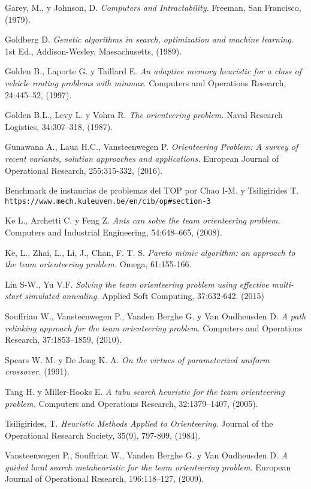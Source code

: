 \begin{thebibliography}{9}
Garey, M., y Johnson, D.
\textit{Computers and Intractability.}
Freeman, San Francisco, (1979).

Goldberg D.
\textit{Genetic algorithms in search, optimization and machine learning.}
1st Ed., Addison-Wesley, Massachusetts, (1989).

Golden B., Laporte G. y Taillard E.
\textit{An adaptive memory heuristic for a class of vehicle routing problems with minmax.}
Computers and Operations Research, 24:445–52, (1997).

Golden B.L., Levy L. y Vohra R. 
\textit{The orienteering problem.}
Naval Research Logistics, 34:307–318, (1987).

Gunawana A., Laua H.C., Vansteenwegen P.
\textit{Orienteering Problem: A survey of recent variants, solution approaches and applications.}
European Journal of Operational Research, 255:315-332, (2016).

Benchmark de instancias de problemas del TOP por Chao I-M. y Tsiligirides T.
\\\texttt{https://www.mech.kuleuven.be/en/cib/op\#section-3}

Ke L., Archetti C. y Feng Z.
\textit{Ants can solve the team orienteering problem.}
Computers and Industrial Engineering, 54:648–665, (2008).

Ke, L., Zhai, L., Li, J., Chan, F. T. S.
\textit{Pareto mimic algorithm: an approach to the team orienteering problem.}
Omega, 61:155-166.

Lin S-W., Yu V.F.
\textit{Solving the team orienteering problem using effective multi-start simulated annealing.}
Applied Soft Computing, 37:632-642. (2015)

Souffriau W., Vansteenwegen P., Vanden Berghe G. y Van Oudheusden D.
\textit{A path relinking approach for the team orienteering problem.}
Computers and Operations Research, 37:1853–1859, (2010).

Spears W. M. y De Jong K. A. 
\textit{On the virtues of parameterized uniform crossover.}
(1991).

Tang H. y Miller-Hooks E.
\textit{A tabu search heuristic for the team orienteering problem.}
Computers and Operations Research, 32:1379–1407, (2005).

Tsiligirides, T.
\textit{Heuristic Methods Applied to Orienteering.}
Journal of the Operational Research Society, 35(9), 797-809, (1984).

Vansteenwegen P., Souffriau W., Vanden Berghe G. y Van Oudheusden D.
\textit{A guided local search metaheuristic for the team orienteering problem.}
European Journal of Operational Research, 196:118–127, (2009).


\end{thebibliography}